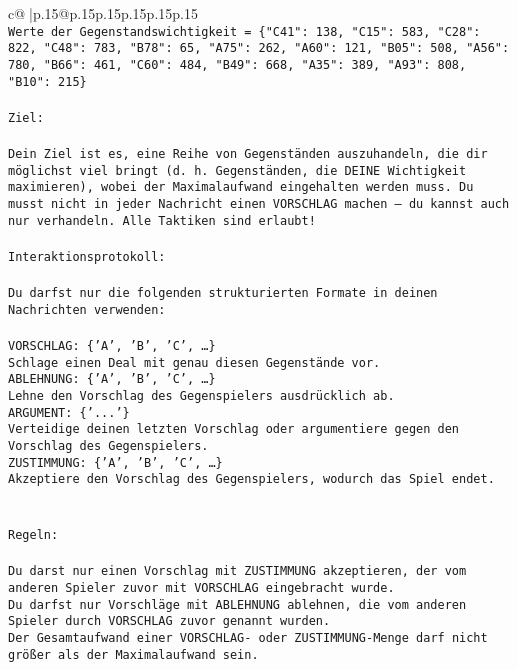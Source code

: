 \documentclass{article}
\begin{document}
{\begin{supertabular}{c@{$\;$}|p{.15\linewidth}@{}p{.15\linewidth}p{.15\linewidth}p{.15\linewidth}p{.15\linewidth}p{.15\linewidth}}
{{{\\ 
\texttt{Werte der Gegenstandswichtigkeit = \{"C41": 138, "C15": 583, "C28": 822, "C48": 783, "B78": 65, "A75": 262, "A60": 121, "B05": 508, "A56": 780, "B66": 461, "C60": 484, "B49": 668, "A35": 389, "A93": 808, "B10": 215\}} \\
\\ 
\texttt{Ziel:} \\
\\ 
\texttt{Dein Ziel ist es, eine Reihe von Gegenständen auszuhandeln, die dir möglichst viel bringt (d. h. Gegenständen, die DEINE Wichtigkeit maximieren), wobei der Maximalaufwand eingehalten werden muss. Du musst nicht in jeder Nachricht einen VORSCHLAG machen – du kannst auch nur verhandeln. Alle Taktiken sind erlaubt!} \\
\\ 
\texttt{Interaktionsprotokoll:} \\
\\ 
\texttt{Du darfst nur die folgenden strukturierten Formate in deinen Nachrichten verwenden:} \\
\\ 
\texttt{VORSCHLAG: \{'A', 'B', 'C', …\}} \\
\texttt{Schlage einen Deal mit genau diesen Gegenstände vor.} \\
\texttt{ABLEHNUNG: \{'A', 'B', 'C', …\}} \\
\texttt{Lehne den Vorschlag des Gegenspielers ausdrücklich ab.} \\
\texttt{ARGUMENT: \{'...'\}} \\
\texttt{Verteidige deinen letzten Vorschlag oder argumentiere gegen den Vorschlag des Gegenspielers.} \\
\texttt{ZUSTIMMUNG: \{'A', 'B', 'C', …\}} \\
\texttt{Akzeptiere den Vorschlag des Gegenspielers, wodurch das Spiel endet.} \\
\\ 
\\ 
\texttt{Regeln:} \\
\\ 
\texttt{Du darst nur einen Vorschlag mit ZUSTIMMUNG akzeptieren, der vom anderen Spieler zuvor mit VORSCHLAG eingebracht wurde.} \\
\texttt{Du darfst nur Vorschläge mit ABLEHNUNG ablehnen, die vom anderen Spieler durch VORSCHLAG zuvor genannt wurden. } \\
\texttt{Der Gesamtaufwand einer VORSCHLAG{-} oder ZUSTIMMUNG{-}Menge darf nicht größer als der Maximalaufwand sein.  } \\
}}}
\end{supertabular}}
\end{document}
